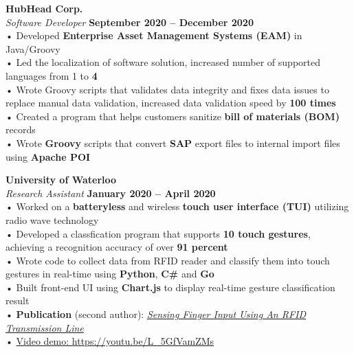 \documentclass[margin,line]{resume}
\begin{document}
\begin{resume}
    \textbf{\listing HubHead Corp.} \vspace{2mm}\\\vspace{1mm}%
    \textsl{Software Developer} \hfill \textbf{September 2020 -- December 2020}\\
    • Developed \textbf{Enterprise Asset Management Systems (EAM)} in Java/Groovy\\
    • Led the localization of software solution, increased number of supported languages from 1 to \textbf{4}\\
    • Wrote Groovy scripts that validates data integrity and fixes
    data issues to replace manual data validation,
    increased data validation speed by \textbf{100 times}\\
    • Created a program that helps customers sanitize \textbf{bill of materials (BOM)} records\\
    • Wrote \textbf{Groovy} scripts that convert \textbf{SAP} export files to internal import files using \textbf{Apache POI}
    \vspace{-1mm}

    \textbf{\listing University of Waterloo} \vspace{2mm}\\\vspace{1mm}%
    \textsl{Research Assistant} \hfill \textbf{January 2020 -- April 2020}\\
    • Worked on a \textbf{batteryless} and wireless \textbf{touch user interface (TUI)} utilizing radio wave technology \\
    • Developed a classfication program that supports \textbf{10 touch gestures}, achieving a recognition accuracy of over \textbf{91 percent}\\
    • Wrote code to collect data from RFID reader and classify them into touch gestures in real-time using \textbf{Python}, \textbf{C\#} and \textbf{Go}\\
    • Built front-end UI using \textbf{Chart.js} to display real-time gesture classification result\\
    • \textbf{Publication} (second author): \href{https://dl.acm.org/doi/10.1145/3384419.3430712}{\emph{Sensing Finger Input Using An RFID Transmission Line}}\\
    • \href{https://youtu.be/L_5GfVamZMs}{Video demo: https://youtu.be/L\_5GfVamZMs}
    \vspace{-1mm}


\end{resume}
\end{document}
